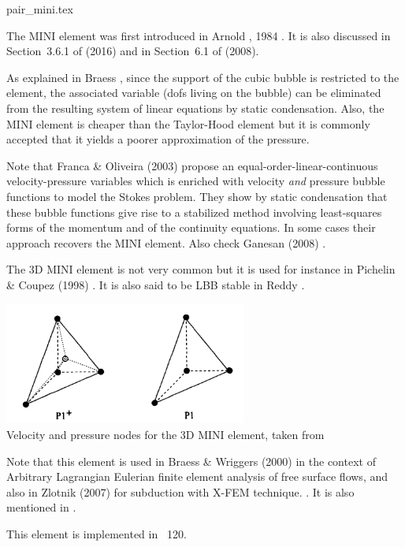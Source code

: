 \begin{flushright} {\tiny {\color{gray} pair\_mini.tex}} \end{flushright}

\noindent
\begin{minipage}{0.48\textwidth}
The  MINI element was first introduced in Arnold \etal, 1984 \cite{arbf84}.
It is also discussed in Section~3.6.1 of \textcite{john16} (2016) and in Section~6.1 
of \textcite{bobf08} (2008).

As explained in Braess \cite{braess}, since the support of the cubic bubble is restricted to the element, 
the associated variable (dofs living on the bubble) can be eliminated from the resulting 
system of linear equations by static condensation. 
Also, the MINI element is cheaper than the Taylor-Hood element but it is commonly accepted
that it yields a poorer approximation of the pressure.
\end{minipage}\hfill
\begin{minipage}{0.48\textwidth}

\end{minipage}

\begin{remark}
Note that Franca \& Oliveira (2003) \cite{frol03} propose an equal-order-linear-continuous 
velocity-pressure variables which is enriched 
with velocity {\it and} pressure bubble functions to model the Stokes problem. 
They show by static condensation that
these bubble functions give rise to a stabilized method involving least-squares forms of 
the momentum and of the
continuity equations. In some cases their approach recovers 
the MINI element. Also check Ganesan \etal (2008) \cite{gamt08}.
\end{remark}


The 3D MINI element is not very common but it is used for instance in Pichelin \& Coupez (1998) 
\cite{pico98}. It is also said to be LBB stable in Reddy \cite[p180]{reddybook2}.

\begin{center}
\includegraphics[width=8cm]{images/mini/mini3D}\\
{\captionfont Velocity and pressure nodes for the 3D MINI element, taken from \cite{pico98}}
\end{center}

Note that this element is used in Braess \& Wriggers (2000) \cite{brwr00} 
in the context of Arbitrary Lagrangian Eulerian 
finite element analysis of free surface flows, and also 
in Zlotnik \etal (2007) \cite{zldf07} for subduction with X-FEM technique. 
. It is also mentioned in \textcite{nath93}.

This element is implemented in \stone~120.

